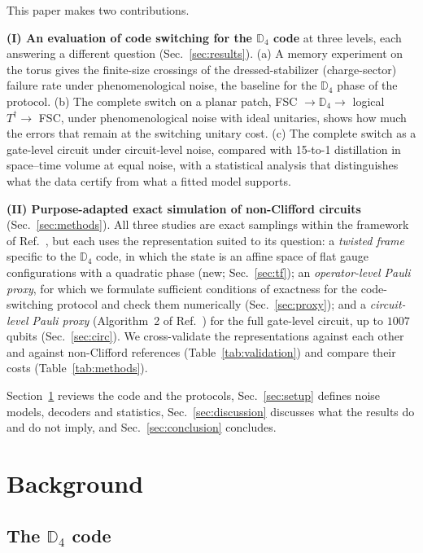 \documentclass[a4paper]{article}
\begin{document}
This paper makes two contributions.

\textbf{(I) An evaluation of code switching for the $\mathbb{D}_4$ code} at three levels, each answering a different question (Sec.~\ref{sec:results}). (a) A memory experiment on the torus gives the finite-size crossings of the dressed-stabilizer (charge-sector) failure rate under phenomenological noise, the baseline for the $\mathbb{D}_4$ phase of the protocol. (b) The complete switch on a planar patch, FSC $\to\mathbb{D}_4\to$ logical $T^\dagger\to$ FSC, under phenomenological noise with ideal unitaries, shows how much the errors that remain at the switching unitary cost. (c) The complete switch as a gate-level circuit under circuit-level noise, compared with 15-to-1 distillation in space--time volume at equal noise, with a statistical analysis that distinguishes what the data certify from what a fitted model supports.

\textbf{(II) Purpose-adapted exact simulation of non-Clifford circuits} (Sec.~\ref{sec:methods}). All three studies are exact samplings within the framework of Ref.~\cite{takada2026exact}, but each uses the representation suited to its question: a \emph{twisted frame} specific to the $\mathbb{D}_4$ code, in which the state is an affine space of flat gauge configurations with a quadratic phase (new; Sec.~\ref{sec:tf}); an \emph{operator-level Pauli proxy}, for which we formulate sufficient conditions of exactness for the code-switching protocol and check them numerically (Sec.~\ref{sec:proxy}); and a \emph{circuit-level Pauli proxy} (Algorithm~2 of Ref.~\cite{takada2026exact}) for the full gate-level circuit, up to $1007$ qubits (Sec.~\ref{sec:circ}). We cross-validate the representations against each other and against non-Clifford references (Table~\ref{tab:validation}) and compare their costs (Table~\ref{tab:methods}).

Section~\ref{sec:background} reviews the code and the protocols, Sec.~\ref{sec:setup} defines noise models, decoders and statistics, Sec.~\ref{sec:discussion} discusses what the results do and do not imply, and Sec.~\ref{sec:conclusion} concludes.

\section{Background}
\label{sec:background}

\subsection{The $\mathbb{D}_4$ code}
\label{sec:d4}
\end{document}
